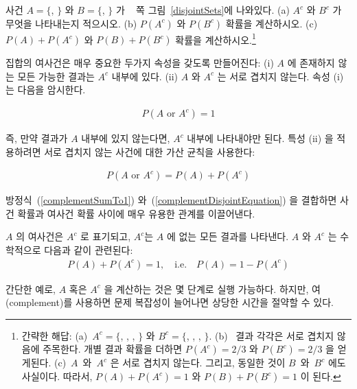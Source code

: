 \begin{exercise}
사건 $A=\{$, $\}$ 와 $B=\{$, $\}$ 가 ~\pageref{disjointSets} 쪽 그림~\ref{disjointSets}에 나와있다. (a) $A^c$ 와 $B^c$ 가 무엇을 나타내는지 적으시오. (b) $P(A^c)$ 와 $P(B^c)$ 확률을 계산하시오. (c) $P(A)+P(A^c)$ 와 $P(B)+P(B^c)$ 확률을 계산하시오.\footnote{간략한 해답: (a)~$A^c=\{$, , , $\}$ 와 $B^c=\{$, , , $\}$. (b)~
결과 각각은 서로 겹치지 않음에 주목한다. 개별 결과 확률을 더하면 $P(A^c)=2/3$ 와 $P(B^c)=2/3$ 을 얻게된다. (c)~$A$~와~$A^c$ 은 서로 겹치지 않는다. 그리고, 동일한 것이 $B$~와~$B^c$ 에도 사실이다. 따라서, $P(A) + P(A^c) = 1$ 와 $P(B) + P(B^c) = 1$ 이 된다.}
\end{exercise}

집합의 여사건은 매우 중요한 두가지 속성을 갖도록 만들어진다: 
(i) $A$ 에 존재하지 않는 모든 가능한 결과는 $A^c$ 내부에 있다. (ii) $A$ 와 $A^c$ 는 서로 겹치지 않는다. 속성 (i) 는 다음을 암시한다.

\begin{eqnarray}
P(A\text{ or }A^c) = 1
\label{complementSumTo1}
\end{eqnarray}

즉, 만약 결과가 $A$ 내부에 있지 않는다면, $A^c$ 내부에 나타내야만 된다. 특성 (ii) 을 적용하려면 서로 겹치지 않는 사건에 대한 가산 균칙을 사용한다:

\begin{eqnarray}
P(A\text{ or }A^c) = P(A) + P(A^c)
\label{complementDisjointEquation}
\end{eqnarray}

방정식~(\ref{complementSumTo1}) 와~(\ref{complementDisjointEquation}) 을 결합하면 사건 확률과 여사건 확률 사이에 매우 유용한 관계를 이끌어낸다.

\begin{termBox}{
$A$ 의 여사건은 $A^c$ 로 표기되고, $A^c$는 $A$ 에 없는 모든 결과를 나타낸다. $A$ 와 $A^c$ 는 수학적으로 다음과 같이 관련된다: \vspace{-2mm}
\begin{eqnarray}\label{complement}
P(A) + P(A^c) = 1, \quad\text{i.e.}\quad P(A) = 1-P(A^c)
\end{eqnarray}\vspace{-6.5mm}}
\end{termBox}

간단한 예로, $A$ 혹은 $A^c$ 을 계산하는 것은 몇 단계로 실행 가능하다. 하지만, 여(complement)를 사용하면 문제 복잡성이 늘어나면 상당한 시간을 절약할 수 있다.


